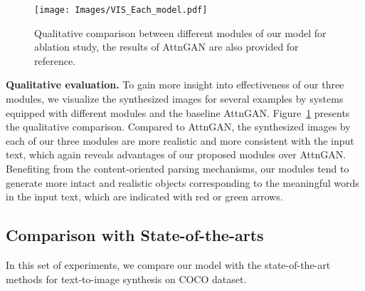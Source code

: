 \documentclass[runningheads]{llncs}
\begin{document}
\begin{figure}[!t]
\centering
\texttt{[image: Images/VIS\_Each\_model.pdf]}
\caption{Qualitative comparison between different modules of our model for ablation study, the results of AttnGAN are also provided for reference.}
\label{fig:ablation_vis}
\end{figure}

 \noindent\textbf{Qualitative evaluation.}
 To gain more insight into effectiveness of our three modules, we visualize the synthesized images for several examples by systems equipped with different modules and the baseline AttnGAN. Figure~\ref{fig:ablation_vis} presents the qualitative comparison. 
 Compared to AttnGAN, the synthesized images by each of our three modules are more realistic and more consistent with the input text, which again reveals advantages of our proposed modules over AttnGAN. Benefiting from the content-oriented parsing mechanisms, our modules tend to generate more intact and realistic objects corresponding to the meaningful words in the input text, which are indicated with red or green arrows.
 
\subsection{Comparison with State-of-the-arts}
In this set of experiments, we compare our model with the state-of-the-art methods for text-to-image synthesis on COCO dataset. 
\end{document}
